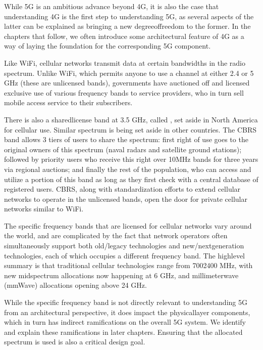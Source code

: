\documentclass[a4paper,11pt,english]{sphinxmanual}
\begin{document}
\sphinxAtStartPar
While 5G is an ambitious advance beyond 4G, it is also the case that
understanding 4G is the first step to understanding 5G, as several
aspects of the latter can be explained as bringing a new
degree\sphinxhyphen{}of\sphinxhyphen{}freedom to the former. In the chapters that follow, we often
introduce some architectural feature of 4G as a way of laying the
foundation for the corresponding 5G component.

\sphinxAtStartPar
Like Wi\sphinxhyphen{}Fi, cellular networks transmit data at certain bandwidths in the
radio spectrum. Unlike Wi\sphinxhyphen{}Fi, which permits anyone to use a channel at
either 2.4 or 5 GHz (these are unlicensed bands), governments have
auctioned off and licensed exclusive use of various frequency bands to
service providers, who in turn sell mobile access service to their
subscribers.

\sphinxAtStartPar
There is also a shared\sphinxhyphen{}license band at 3.5 GHz, called , set aside in North America for cellular
use. Similar spectrum is being set aside in other countries. The CBRS band
allows 3 tiers of users to share the spectrum: first right of use
goes to the original owners of this spectrum (naval radars and satellite
ground stations); followed by priority users who receive this right over
10MHz bands for three years via regional auctions; and finally the rest
of the population, who can access and utilize a portion of this band as
long as they first check with a central database of registered users.
CBRS, along with standardization efforts to extend cellular networks to
operate in the unlicensed bands, open the door for private cellular
networks similar to Wi\sphinxhyphen{}Fi.

\sphinxAtStartPar
The specific frequency bands that are licensed for cellular networks
vary around the world, and are complicated by the fact that network
operators often simultaneously support both old/legacy technologies and
new/next\sphinxhyphen{}generation technologies, each of which occupies a different
frequency band. The high\sphinxhyphen{}level summary is that traditional cellular
technologies range from 700\sphinxhyphen{}2400 MHz, with new mid\sphinxhyphen{}spectrum
allocations now happening at 6 GHz, and millimeter\sphinxhyphen{}wave (mmWave)
allocations opening above 24 GHz.

\sphinxAtStartPar
While the specific frequency band is not directly relevant to
understanding 5G from an architectural perspective, it does impact the
physical\sphinxhyphen{}layer components, which in turn has indirect ramifications on
the overall 5G system. We identify and explain these ramifications
in later chapters. Ensuring that the allocated spectrum is used
 is also a critical design goal.
\end{document}
